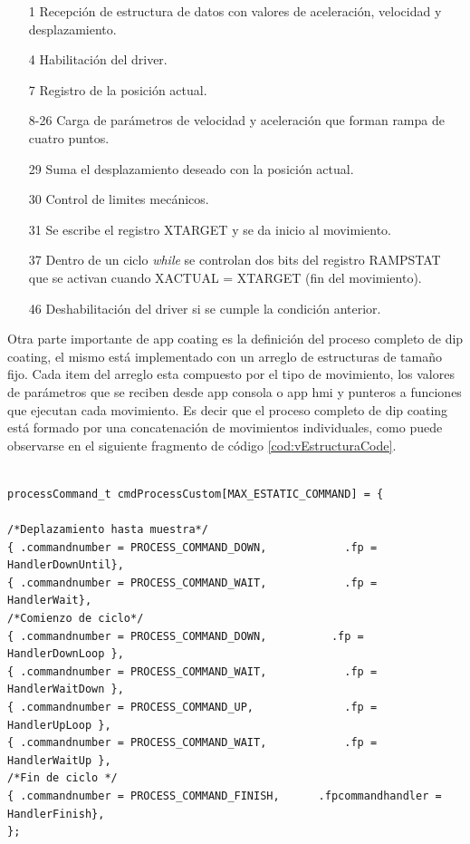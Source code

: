 \begin{itemize}
\item [1] Recepción de estructura de datos con valores de aceleración, velocidad y desplazamiento.
\item [4] Habilitación del driver.
\item [7] Registro de la posición actual.
\item [8-26] Carga de parámetros de velocidad y aceleración que forman rampa de cuatro puntos.
\item [29] Suma el desplazamiento deseado con la posición actual.
\item [30] Control de limites mecánicos.
\item [31] Se escribe el registro XTARGET y se da inicio al movimiento.
\item [37] Dentro de un ciclo \textit{while} se controlan dos bits del registro RAMPSTAT que se activan cuando XACTUAL = XTARGET (fin del movimiento).
\item [46] Deshabilitación del driver si se cumple la condición anterior.  
\end{itemize}


Otra parte importante de app coating es la definición del proceso completo de dip coating, el mismo está implementado con un arreglo de estructuras de tamaño fijo. Cada item del arreglo esta compuesto por el tipo de movimiento, los valores de parámetros que se reciben desde app consola o app hmi y punteros a funciones que ejecutan cada movimiento. Es decir que el proceso completo de dip coating está formado por una concatenación de movimientos individuales, como puede observarse en el siguiente fragmento de código \ref{cod:vEstructuraCode}.

\begin{lstlisting}[label=cod:vEstructuraCode,caption=Proceso completo de dip coating.] % 

processCommand_t cmdProcessCustom[MAX_ESTATIC_COMMAND] = {

/*Deplazamiento hasta muestra*/
{ .commandnumber = PROCESS_COMMAND_DOWN, 		 	.fp = HandlerDownUntil},
{ .commandnumber = PROCESS_COMMAND_WAIT, 			.fp = HandlerWait},
/*Comienzo de ciclo*/
{ .commandnumber = PROCESS_COMMAND_DOWN, 		  .fp = HandlerDownLoop },
{ .commandnumber = PROCESS_COMMAND_WAIT, 			.fp = HandlerWaitDown },
{ .commandnumber = PROCESS_COMMAND_UP, 			 	.fp = HandlerUpLoop },
{ .commandnumber = PROCESS_COMMAND_WAIT, 			.fp = HandlerWaitUp },
/*Fin de ciclo */
{ .commandnumber = PROCESS_COMMAND_FINISH,		.fpcommandhandler = HandlerFinish},
}; 

\end{lstlisting}

